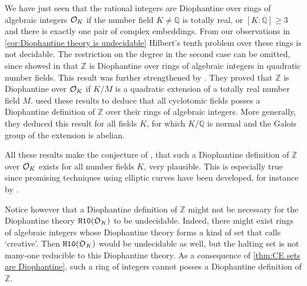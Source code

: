 We have just seen that the rational integers are Diophantine over rings of
algebraic integers \(\mathcal{O}_{K}\) if the number field \(K ≠ ℚ\) is totally real, or
\([K : ℚ] ≥ 3\) and there is exactly one pair of complex embeddings. From our
observations in \cref{cor:Diophantine theory is undecidable} Hilbert's tenth
problem over these rings is not decidable. The restriction on the degree in the
second case can be omitted, since \textcite{Denef1975} showed in
\citeyear{Denef1975} that \(ℤ\) is Diophantine over rings of algebraic integers
in quadratic number fields. This result was further strengthened by
\textcite{Denef1978}. They proved that \(ℤ\) is Diophantine over \(\mathcal{O}_{K}\) if
\(K / M\) is a quadratic extension of a totally real number field \(M\).
\textcite{Shapiro1989} used these results to deduce that all cyclotomic fields
posses a Diophantine definition of \(ℤ\) over their rings of algebraic integers.
More generally, they deduced this result for all fields \(K\), for which \(K/ℚ\)
is normal and the Galois group of the extension is abelian.

All these results make the conjecture of \textcite{Denef1978}, that such a
Diophantine definition of \(ℤ\) over \(\mathcal{O}_{K}\) exists for all number fields
\(K\), very plausible. This is especially true since promising techniques using
elliptic curves have been developed, for instance by \textcite{Poonen2002}.

Notice however that a Diophantine definition of \(ℤ\) might not be necessary for
the Diophantine theory \(\mathtt{H10}(\mathfrak{O}_K)\) to be undecidable. Indeed,
there might exist rings of algebraic integers whose Diophantine theory forms a
kind of set that \textcite{Post1944} calls ‘creative’. Then
\(\mathtt{H10}(\mathfrak{O}_K)\) would be undecidable as well, but the halting set
is not many-one reducible to this Diophantine theory. As a consequence of
\cref{thm:CE sets are Diophantine}, such a ring of integers cannot posses a
Diophantine definition of \(ℤ\).

